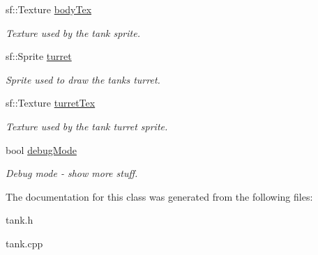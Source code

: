 \begin{DoxyCompactItemize}
\mbox{\label{class_tank_a817b1646c30f381340304fcd4b88fb3e}} 
sf\+::\+Texture \mbox{\hyperlink{class_tank_a817b1646c30f381340304fcd4b88fb3e}{body\+Tex}}
\begin{DoxyCompactList}\small\item\em Texture used by the tank sprite. \end{DoxyCompactList}\item 
\mbox{\label{class_tank_af180aa607b98adf48c8064b1c78f14e3}} 
sf\+::\+Sprite \mbox{\hyperlink{class_tank_af180aa607b98adf48c8064b1c78f14e3}{turret}}
\begin{DoxyCompactList}\small\item\em Sprite used to draw the tanks turret. \end{DoxyCompactList}\item 
\mbox{\label{class_tank_a60849721eb299a75ceaacbde0565fe97}} 
sf\+::\+Texture \mbox{\hyperlink{class_tank_a60849721eb299a75ceaacbde0565fe97}{turret\+Tex}}
\begin{DoxyCompactList}\small\item\em Texture used by the tank turret sprite. \end{DoxyCompactList}\item 
\mbox{\label{class_tank_a891f14d486b465194b9cd043b07451ba}} 
bool \mbox{\hyperlink{class_tank_a891f14d486b465194b9cd043b07451ba}{debug\+Mode}}
\begin{DoxyCompactList}\small\item\em Debug mode -\/ show more stuff. \end{DoxyCompactList}\end{DoxyCompactItemize}


The documentation for this class was generated from the following files\+:\begin{DoxyCompactItemize}
\item 
tank.\+h\item 
tank.\+cpp\end{DoxyCompactItemize}
